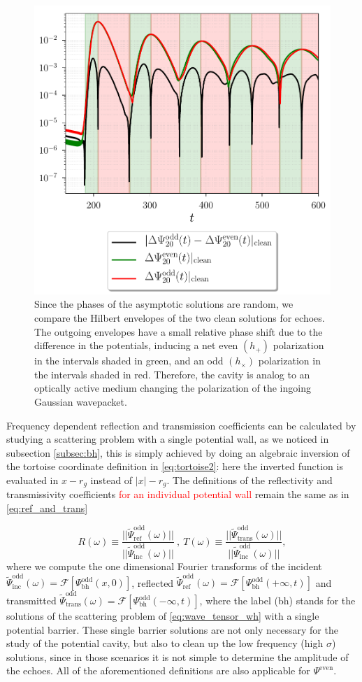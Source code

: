 \documentclass[article,aps,nofootinbib,twocolumn,superscriptaddress]{revtex4-1}
\begin{document}
\begin{figure}[t!]
\centering
\includegraphics[width=.45\textwidth]{figures/Polarimetry_echo_w_06495.pdf}
\caption{\label{fig:pol} Since the phases of the asymptotic solutions are random, we compare the Hilbert envelopes of the two clean solutions for echoes. The outgoing envelopes have a small relative phase shift due to the difference in the potentials, inducing a net even $(h_+)$ polarization in the intervals shaded in green, and an odd $(h_{\times})$ polarization in the intervals shaded in red. Therefore, the cavity is analog to an optically active medium changing the polarization of the ingoing Gaussian wavepacket.}
\end{figure}

Frequency dependent reflection and transmission coefficients can be calculated by studying a scattering problem with a single potential wall, as we noticed in subsection \ref{subsec:bh}, this is simply achieved by doing an algebraic inversion of the tortoise coordinate definition in \eqref{eq:tortoise2}: here the inverted function is evaluated in $x-r_g$ instead of $|x|-r_g$. The definitions of the reflectivity and transmissivity coefficients \textcolor{red}{for an individual potential wall} remain the same as in \eqref{eq:ref_and_trans}

\begin{equation}
R(\omega)\equiv \frac{||\tilde{\Psi}_{\mathrm{ref}}^{\mathrm{odd}}(\omega)||}{||\tilde{\Psi}_{\mathrm{inc}}^{\mathrm{odd}}(\omega)||}~,~T(\omega)\equiv  \frac{||\tilde{\Psi}_{\mathrm{trans}}^{\mathrm{odd}}(\omega)||}{||\tilde{\Psi}_{\mathrm{inc}}^{\mathrm{odd}}(\omega)||},
\label{eq:odd_ref_and_trans}
\end{equation}
where we compute the one dimensional Fourier transforms of the incident $\tilde{\Psi}_{\mathrm{inc}}^{\mathrm{odd}}(\omega)=\mathcal{F}[\Psi^{\mathrm{odd}}_{\mathrm{bh}}(x,0)]$, reflected $\tilde{\Psi}_{\mathrm{ref}}^{\mathrm{odd}}(\omega)=\mathcal{F}[\Psi^{\mathrm{odd}}_{\mathrm{bh}}(+\infty,t)]$ and transmitted $\tilde{\Psi}_{\mathrm{trans}}^{\mathrm{odd}}(\omega)=\mathcal{F}[\Psi^{\mathrm{odd}}_{\mathrm{bh}}(-\infty,t)]$, where the label (bh) stands for the solutions of the scattering problem of \eqref{eq:wave_tensor_wh} with a single potential barrier. These single barrier solutions are not only necessary for the study of the potential cavity, but also to clean up the low frequency (high $\sigma$) solutions, since in those scenarios it is not simple to determine the amplitude of the echoes. All of the aforementioned definitions are also applicable for $\Psi^{\mathrm{even}}$. 
\end{document}
